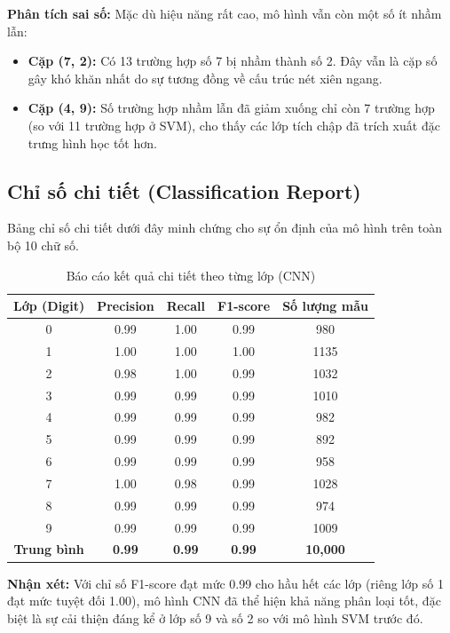 \documentclass[../DoAn.tex]{subfiles}
\begin{document}
\textbf{Phân tích sai số:} Mặc dù hiệu năng rất cao, mô hình vẫn còn một số ít nhầm lẫn:
\begin{itemize}
    \item \textbf{Cặp (7, 2):} Có 13 trường hợp số 7 bị nhầm thành số 2. Đây vẫn là cặp số gây khó khăn nhất do sự tương đồng về cấu trúc nét xiên ngang.
    \item \textbf{Cặp (4, 9):} Số trường hợp nhầm lẫn đã giảm xuống chỉ còn 7 trường hợp (so với 11 trường hợp ở SVM), cho thấy các lớp tích chập đã trích xuất đặc trưng hình học tốt hơn.
\end{itemize}

\subsection{Chỉ số chi tiết (Classification Report)}

Bảng chỉ số chi tiết dưới đây minh chứng cho sự ổn định của mô hình trên toàn bộ 10 chữ số.

\begin{table}[H]
\centering
\caption{Báo cáo kết quả chi tiết theo từng lớp (CNN)}
\label{tab:cnn_report}
\begin{tabular}{|c|c|c|c|c|}
\hline
\textbf{Lớp (Digit)} & \textbf{Precision} & \textbf{Recall} & \textbf{F1-score} & \textbf{Số lượng mẫu} \\ \hline
0 & 0.99 & 1.00 & 0.99 & 980 \\ \hline
1 & 1.00 & 1.00 & 1.00 & 1135 \\ \hline
2 & 0.98 & 1.00 & 0.99 & 1032 \\ \hline
3 & 0.99 & 0.99 & 0.99 & 1010 \\ \hline
4 & 0.99 & 0.99 & 0.99 & 982 \\ \hline
5 & 0.99 & 0.99 & 0.99 & 892 \\ \hline
6 & 0.99 & 0.99 & 0.99 & 958 \\ \hline
7 & 1.00 & 0.98 & 0.99 & 1028 \\ \hline
8 & 0.99 & 0.99 & 0.99 & 974 \\ \hline
9 & 0.99 & 0.99 & 0.99 & 1009 \\ \hline
\hline
\textbf{Trung bình} & \textbf{0.99} & \textbf{0.99} & \textbf{0.99} & \textbf{10,000} \\ \hline
\end{tabular}
\end{table}

\textbf{Nhận xét:} Với chỉ số F1-score đạt mức 0.99 cho hầu hết các lớp (riêng lớp số 1 đạt mức tuyệt đối 1.00), mô hình CNN đã thể hiện khả năng phân loại tốt, đặc biệt là sự cải thiện đáng kể ở lớp số 9 và số 2 so với mô hình SVM trước đó.
\end{document}

